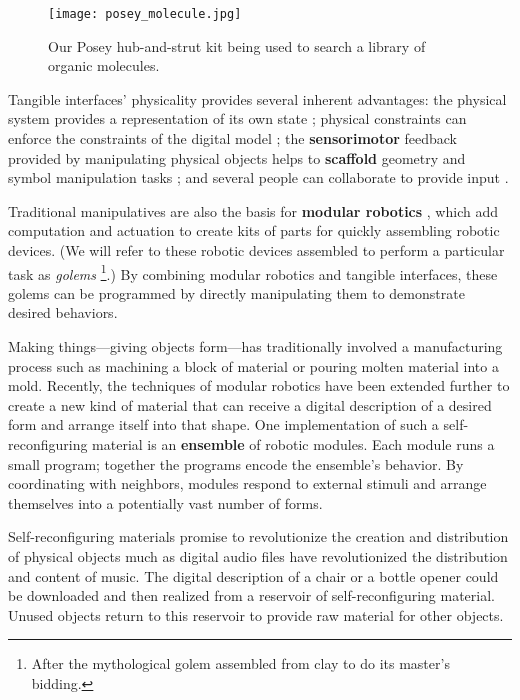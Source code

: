 \begin{figure}[tb]
  \centering
    \texttt{[image: posey\_molecule.jpg]}
  \caption{Our Posey hub-and-strut kit being used to search a library of organic molecules.}
  \label{fig:posey_molecule}
\end{figure}

Tangible interfaces' physicality provides several inherent advantages: the physical system provides a representation of its own state \citep{jacob_chi2008}; physical constraints can enforce the constraints of the digital model \citep{patten_chi2007}; the \textbf{sensorimotor} feedback provided by manipulating physical objects helps to \textbf{scaffold} geometry and symbol manipulation tasks \citep{nesta_tangible_learning}; and several people can collaborate to provide input \citep{handsaw,algoblock}.

Traditional manipulatives are also the basis for \textbf{modular robotics} \citep{yim_ra2007}, which add computation and actuation to create kits of parts for quickly assembling robotic devices. 
(We will refer to these robotic devices assembled to perform a particular task as \emph{golems}%
\footnote{After the mythological golem assembled from clay to do its master's bidding.}.) 
By combining modular robotics and tangible interfaces, these golems can be programmed by directly manipulating them to demonstrate desired behaviors.

Making things---giving objects form---has traditionally involved a manufacturing process such as machining a block of material or pouring molten material into a mold. 
Recently, the techniques of modular robotics have been extended further to create a new kind of material that can receive a digital description of a desired form and arrange itself into that shape. 
One implementation of such a self{}-reconfiguring material is an \textbf{ensemble} of robotic modules. 
Each module runs a small program; together the programs encode the ensemble's behavior. 
By coordinating with neighbors, modules respond to external stimuli and arrange themselves into a potentially vast number of forms.

Self{}-reconfiguring materials promise to revolutionize the creation and distribution of physical objects much as digital audio files have revolutionized the distribution and content of music. 
The digital description of a chair or a bottle opener could be downloaded and then realized from a reservoir of self{}-reconfiguring material. 
Unused objects return to this reservoir to provide raw material for other objects.

